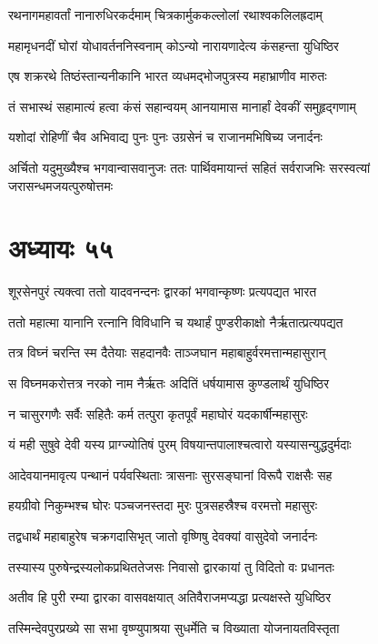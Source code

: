 \twolineshloka
{रथनागमहावर्तां नानारुधिरकर्दमाम्}
{चित्रकार्मुककल्लोलां रथाश्वकलिलह्रदाम्}


\twolineshloka
{महामृधनदीं घोरां योधावर्तननिस्वनाम्}
{कोऽन्यो नारायणादेत्य कंसहन्ता युधिष्ठिर}


\twolineshloka
{एष शक्ररथे तिष्ठंस्तान्यनीकानि भारत}
{व्यधमद्भोजपुत्रस्य महाभ्राणीव मारुतः}


\twolineshloka
{तं सभास्थं सहामात्यं हत्वा कंसं सहान्वयम्}
{आनयामास मानार्हां देवकीं समुहृद्गणाम्}


\twolineshloka
{यशोदां रोहिणीं चैव अभिवाद्य पुनः पुनः}
{उग्रसेनं च राजानमभिषिच्य जनार्दनः}


\threelineshloka
{अर्चितो यदुमुख्यैश्च भगवान्वासवानुजः}
{ततः पार्थिवमायान्तं सहितं सर्वराजभिः}
{सरस्वत्यां जरासन्धमजयत्पुरुषोत्तमः}


\chapter{अध्यायः ५५}
\twolineshloka
{शूरसेनपुरं त्यक्त्वा ततो यादवनन्दनः}
{द्वारकां भगवान्कृष्णः प्रत्यपद्यत भारत}


\twolineshloka
{ततो महात्मा यानानि रत्नानि विविधानि च}
{यथार्हं पुण्डरीकाक्षो नैर्ऋतात्प्रत्यपद्यत}


\twolineshloka
{तत्र विघ्नं चरन्ति स्म दैतेयाः सहदानवैः}
{ताञ्जघान महाबाहुर्वरमत्तान्महासुरान्}


\twolineshloka
{स विघ्नमकरोत्तत्र नरको नाम नैर्ऋतः}
{अदितिं धर्षयामास कुण्डलार्थं युधिष्ठिर}


\twolineshloka
{न चासुरगणैः सर्वैः सहितैः कर्म तत्पुरा}
{कृतपूर्वं महाघोरं यदकार्षीन्महासुरः}


\twolineshloka
{यं मही सुषुवे देवी यस्य प्राग्ज्योतिषं पुरम्}
{विषयान्तपालाश्चत्वारो यस्यासन्युद्धदुर्मदाः}


\twolineshloka
{आदेवयानमावृत्य पन्थानं पर्यवस्थिताः}
{त्रासनाः सुरसङ्घानां विरूपै राक्षसैः सह}


\twolineshloka
{हयग्रीवो निकुम्भश्च घोरः पञ्चजनस्तदा}
{मुरः पुत्रसहस्रैश्च वरमत्तो महासुरः}


\twolineshloka
{तद्वधार्थं महाबाहुरेष चक्रगदासिभृत्}
{जातो वृष्णिषु देवक्यां वासुदेवो जनार्दनः}


\twolineshloka
{तस्यास्य पुरुषेन्द्रस्यलोकप्रथिततेजसः}
{निवासो द्वारकायां तु विदितो वः प्रधानतः}


\twolineshloka
{अतीव हि पुरी रम्या द्वारका वासवक्षयात्}
{अतिवैराजमप्यद्धा प्रत्यक्षस्ते युधिष्ठिर}


\twolineshloka
{तस्मिन्देवपुरप्रख्ये सा सभा वृष्ण्युपाश्रया}
{सुधर्मेति च विख्याता योजनायतविस्तृता}


